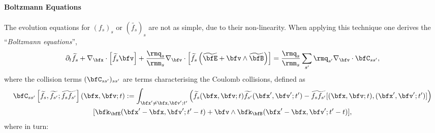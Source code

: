     \paragraph*{Boltzmann Equations} The evolution equations for $(f_{s})_{s}$ or $(\widetilde{f_{s}})_{s}$ are not as simple, due to their non-linearity. When applying this technique one derives the ``\emph{Boltzmann equations}'', \BA{[Ref]}
    \begin{equation}\label{eqn:Boltzmann equation}
        \partial_{t}\widetilde{f_{s}} + \nabla_{\bfx}\cdot\left[\widetilde{f_{s}}\bfv\right] + \frac{\rmq_{s}}{\rmm_{s}}\nabla_{\bfv}\cdot\left[\widetilde{f_{s}}\left(\widetilde{\bfE} + \bfv\wedge\widetilde{\bfB}\right)\right]  =   \frac{\rmq_{s}}{\rmm_{s}}\sum_{s'}\rmq_{s'}\nabla_{\bfv}\cdot\bfC_{ss'},
    \end{equation}
    where the collision terms $(\bfC_{ss'})_{ss'}$ are terms characterising the Coulomb collisions, defined as
    \begin{multline}\label{eqn:collision operator}
        \bfC_{ss'}\left[\widetilde{f_{s}}, \widetilde{f_{s'}}; \widetilde{f_{s}f_{s'}}\right](\bfx, \bfv; t)  :=  \int_{\bfx' \neq \bfx, \bfv'; t'}\left(\widetilde{f_{s}}(\bfx, \bfv; t)\widetilde{f_{s'}}(\bfx', \bfv'; t') - \widetilde{f_{s}f_{s'}}[(\bfx, \bfv; t), (\bfx', \bfv'; t')]\right)  \\
        [\bfk_{\bfE}(\bfx' - \bfx, \bfv'; t' - t) + \bfv\wedge\bfk_{\bfB}(\bfx' - \bfx, \bfv'; t' - t)],
    \end{multline}
    where in turn:
